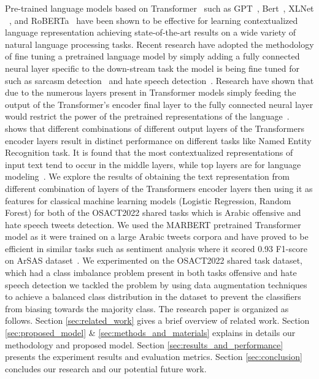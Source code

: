 \documentclass[10pt, a4paper]{article}
\begin{document}
Pre-trained language models based on Transformer~\cite{vaswani2017attention} such as GPT~\cite{radford2018improving}, Bert~\cite{devlin2018bert}, XLNet ~\cite{yang2019deepening}, and RoBERTa~\cite{zhuang2021robustly} have been shown to be effective for learning contextualized language representation achieving state-of-the-art results on a wide variety of natural language processing tasks.
Recent research have adopted the methodology of fine tuning a pretrained language model by simply adding a fully connected neural layer specific to the down-stream task the model is being fine tuned for such as sarcasm detection~\cite{farha2021benchmarking} and hate speech detection~\cite{aldjanabi2021arabic}. Research have shown that due to the numerous layers present in Transformer models simply feeding the output of the Transformer’s encoder final layer to the fully connected neural layer would restrict the power of the pretrained representations of the language~\cite{yang2019deepening}.~\cite{devlin2018bert} shows that different combinations of different output layers of the Transformers encoder layers result in distinct performance on different tasks like Named Entity Recognition task. It is found that the most contextualized representations of input text tend to occur in the middle layers, while top layers are for language modeling~\cite{yang2019deepening}. We explore the results of obtaining the text representation from different combination of layers of the Transformers encoder layers then using it as features for classical machine learning models (Logistic Regression, Random Forest) for both of the OSACT2022 shared tasks which is Arabic offensive and hate speech tweets detection. We used the MARBERT pretrained Transformer model as it were trained on a large Arabic tweets corpora and have proved to be efficient in similar tasks such as sentiment analysis where it scored 0.93 F1-score on ArSAS dataset~\cite{abdul-mageed-etal-2021-arbert}. We experimented on the OSACT2022 shared task dataset, which had a class imbalance problem present in both tasks offensive and hate speech detection we tackled the problem by using data augmentation techniques to achieve a balanced class distribution in the dataset to prevent the classifiers from biasing towards the majority class. The research paper is organized as follows. Section \ref{sec:related_work} gives a brief overview of related work. Section \ref{sec:proposed_model} \& \ref{sec:methods_and_materials} explains in details our methodology and proposed model. Section \ref{sec:results_and_performance} presents the experiment results  and evaluation metrics. Section \ref{sec:conclusion} concludes our research and our potential future work.
\end{document}
